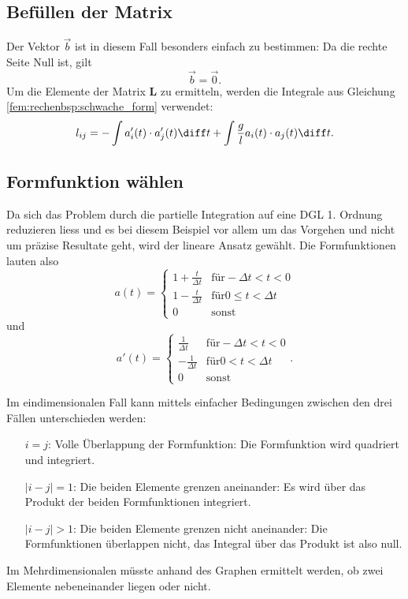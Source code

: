\subsection{Befüllen der Matrix}
Der Vektor $\vec{b}$ ist in diesem Fall besonders einfach zu bestimmen: Da die rechte Seite Null ist, gilt
\begin{equation}
    \vec{b} = \vec{0}.
\end{equation}
Um die Elemente der Matrix $\mathbf{L}$ zu ermitteln, werden die Integrale aus Gleichung \ref{fem:rechenbsp:schwache_form} verwendet:
\begin{equation}
    l_{ij} = - \int a_i'(t) \cdot a_j'(t) \diff t + \int \frac{g}{l} a_i(t) \cdot a_j(t) \diff t.
\end{equation}


\subsection{Formfunktion wählen}
Da sich das Problem durch die partielle Integration auf eine DGL 1. Ordnung reduzieren liess und es bei diesem Beispiel vor allem um das Vorgehen und nicht um präzise Resultate geht, wird der lineare Ansatz gewählt.
Die Formfunktionen lauten also 
\begin{equation}
    a(t) = \left\{ \begin{array}{ll}
        1+\frac{t}{\Delta t} & \mbox{für} -\Delta t < t < 0 \\
        1-\frac{t}{\Delta t} & \mbox{für} 0 \leq t < \Delta t \\
        0 & \mbox{sonst}
    \end{array} \right.
\end{equation}
und
\begin{equation}
    a'(t) = \left\{ \begin{array}{ll}
        \frac{1}{\Delta t} & \mbox{für} -\Delta t < t < 0 \\
        -\frac{1}{\Delta t} & \mbox{für} 0 < t < \Delta t \\
        0 & \mbox{sonst}
    \end{array} \right. .
\end{equation}

Im eindimensionalen Fall kann mittels einfacher Bedingungen zwischen den drei Fällen unterschieden werden:
\begin{itemize}
    \item[$i = j$:] Volle Überlappung der Formfunktion: Die Formfunktion wird quadriert und integriert. 
    \item[$|i - j| = 1$:] Die beiden Elemente grenzen aneinander: Es wird über das Produkt der beiden Formfunktionen integriert.
    \item[$|i - j| > 1$:] Die beiden Elemente grenzen nicht aneinander: Die Formfunktionen überlappen nicht, das Integral über das Produkt ist also null.
\end{itemize}
Im Mehrdimensionalen müsste anhand des Graphen ermittelt werden, ob zwei Elemente nebeneinander liegen oder nicht.

